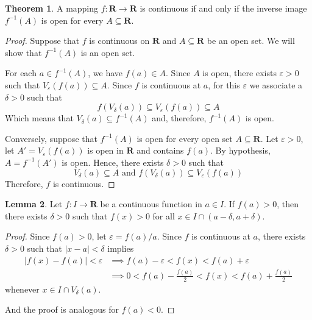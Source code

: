 \documentclass[12pt,a4paper]{article}
\theoremstyle{definition}
\newtheorem{theorem}{Theorem}[section]
\newtheorem{lemma}[theorem]{Lemma}
\begin{document}
\begin{theorem}
	A mapping $f : \textbf{R} \longrightarrow \textbf{R}$ is continuous if and only if the inverse image $f^{-1}(A)$ is open for every $A \subseteq \textbf{R}$.
\end{theorem}

\begin{proof}
	Suppose that $f$ is continuous on $\textbf{R}$ and $A \subseteq \textbf{R}$ be an open set. We will show that $f^{-1}(A)$ is an open set. 
	
	For each $a \in f^{-1}(A)$, we have $f(a) \in A$. Since $A$ is open, there exists $\varepsilon > 0$ such that $V_{\varepsilon}(f(a)) \subseteq A$. Since $f$ is continuous at $a$, for this $\varepsilon$ we associate a $\delta > 0$ such that
	\[
		f(V_{\delta}(a)) \subseteq V_{\varepsilon}(f(a)) \subseteq A
	\]
	Which means that $V_{\delta}(a) \subseteq f^{-1}(A)$ and, therefore, $f^{-1}(A)$ is open.
	
	Conversely, suppose that $f^{-1}(A)$ is open for every open set $A \subseteq \textbf{R}$. Let $\varepsilon > 0$, let $A' = V_{\varepsilon}(f(a))$ is open in $\textbf{R}$ and contains $f(a)$. By hypothesis, $A = f^{-1}(A')$ is open. Hence, there exists $\delta > 0$ such that
	\[
		V_{\delta}(a) \subseteq A \text{ and } f(V_{\delta}(a)) \subseteq V_{\varepsilon}(f(a))
	\]
	Therefore, $f$ is continuous.
\end{proof}

\begin{lemma}
	Let $f : I \longrightarrow \textbf{R}$ be a continuous function in $a \in I$. If $f(a) > 0$, then there exists $\delta > 0$ such that $f(x) > 0$ for all $x \in I \cap (a-\delta, a+ \delta)$.
\end{lemma}

\begin{proof}
	Since $f(a) > 0$, let $\varepsilon = f(a) / a$. Since $f$ is continuous at $a$, there exists $\delta > 0$ such that $|x-a| < \delta$ implies
	\begin{equation*}
		\begin{aligned}
			|f(x) - f(a)| < \varepsilon & \implies f(a) - \varepsilon < f(x) < f(a) + \varepsilon \\
			& \implies 0 < f(a) - \frac{f(a)}{2} < f(x) < f(a) + \frac{f(a)}{2}
		\end{aligned}
	\end{equation*}
	whenever $x \in I \cap V_{\delta}(a)$.
	
	And the proof is analogous for $f(a) < 0$.
\end{proof}
\end{document}
